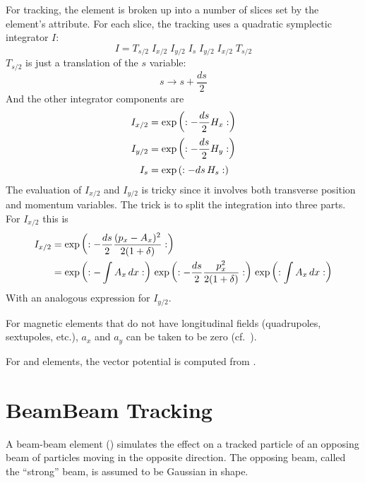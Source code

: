 For tracking, the element is broken up into a number of slices set by
the element's  attribute. For each slice, the tracking
uses a quadratic symplectic integrator $I$:
\begin{equation}
  I = T_{s/2} \; I_{x/2} \; I_{y/2} \; I_s \; I_{y/2} \; I_{x/2} \; T_{s/2}
\end{equation}
$T_{s/2}$ is just a translation of the $s$ variable:
\begin{equation}
  s \rightarrow s + \frac{ds}{2}
\end{equation}
And the other integrator components are
\begin{align}
  I_{x/2} &= \exp \left( : -\frac{ds}{2} H_x : \right) \nonumber \\
  I_{y/2} &= \exp \left( : -\frac{ds}{2} H_y : \right) \\
  I_{s}   &= \exp \left( : -ds \, H_s : \right) \nonumber
\end{align}
The evaluation of $I_{x/2}$ and $I_{y/2}$ is tricky since it involves both transverse
position and momentum variables. The trick is to split the integration into three parts.
For $I_{x/2}$ this is
\begin{align}
  I_{x/2} &= \exp \left( : -\frac{ds}{2} \frac{(p_x - A_x)^2}{2 (1 + \delta)} : \right) \nonumber \\
  &= \exp \left( : -\int A_x \, dx : \right) \,
     \exp \left( : -\frac{ds}{2} \frac{p_x^2}{2 (1 + \delta)} : \right) \,
     \exp \left( : \int A_x \, dx : \right)
  \label{ids2}
\end{align}
With an analogous expression for $I_{y/2}$.

For magnetic elements that do not have longitudinal fields
(quadrupoles, sextupoles, etc.), $a_x$ and $a_y$ can be taken to be
zero (cf.~).

For  and  elements, the vector potential is computed from
.

\section{BeamBeam Tracking}
\label{s:beambeam.std}

A beam-beam element () simulates the effect on a tracked particle of an opposing
beam of particles moving in the opposite direction. The opposing beam, called the ``strong'' beam,
is assumed to be Gaussian in shape.


